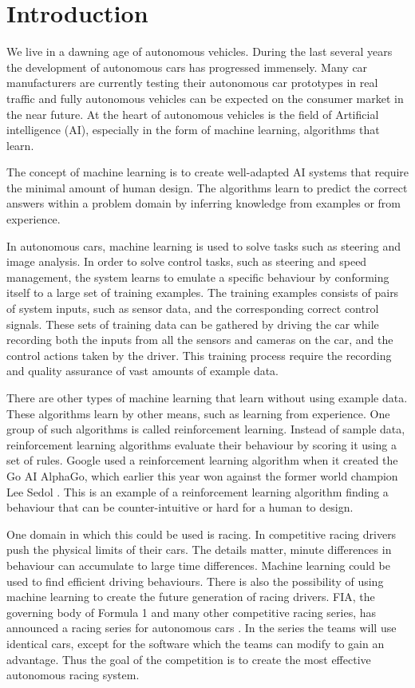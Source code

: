 \chapter{Introduction}

We live in a dawning age of autonomous vehicles. During the last several years the development of autonomous cars has progressed immensely. Many car manufacturers are currently testing their autonomous car prototypes in real traffic and fully autonomous vehicles can be expected on the consumer market in the near future. At the heart of autonomous vehicles is the field of Artificial intelligence (AI), especially in the form of machine learning, algorithms that learn.

The concept of machine learning is to create well-adapted AI systems that require the minimal amount of human design. The algorithms learn to predict the correct answers within a problem domain by inferring knowledge from examples or from experience. 

In autonomous cars, machine learning is used to solve tasks such as steering and image analysis. In order to solve control tasks, such as steering and speed management, the system learns to emulate a specific behaviour by conforming itself to a large set of training examples. The training examples consists of pairs of system inputs, such as sensor data, and the corresponding correct control signals. These sets of training data can be gathered by driving the car while recording both the inputs from all the sensors and cameras on the car, and the control actions taken by the driver. This training process require the recording and quality assurance of vast amounts of example data.

There are other types of machine learning that learn without using example data. These algorithms learn by other means, such as learning from experience. One group of such algorithms is called reinforcement learning. Instead of sample data, reinforcement learning algorithms evaluate their behaviour by scoring it using a set of rules. Google used a reinforcement learning algorithm when it created the Go AI AlphaGo, which earlier this year won against the former world champion Lee Sedol \cite{AlphaGo}. This is an example of a reinforcement learning algorithm finding a behaviour that can be counter-intuitive or hard for a human to design.

One domain in which this could be used is racing. In competitive racing drivers push the physical limits of their cars. The details matter, minute differences in behaviour can accumulate to large time differences. Machine learning could be used to find efficient driving behaviours. There is also the possibility of using machine learning to create the future generation of racing drivers. FIA, the governing body of Formula 1 and many other competitive racing series, has announced a racing series for autonomous cars \cite{roborace}. In the series the teams will use identical cars, except for the software which the teams can modify to gain an advantage. Thus the goal of the competition is to create the most effective autonomous racing system. 

